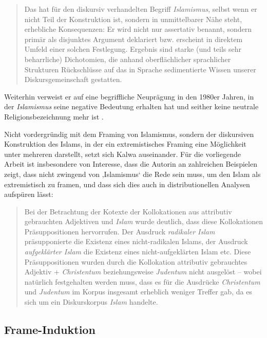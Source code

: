 \begin{quote}
Das hat für den diskursiv verhandelten Begriff \emph{Islamismus}, selbst wenn er nicht Teil der Konstruktion ist, sondern in unmittelbarer Nähe steht, erhebliche Konsequenzen: Er wird nicht nur assertativ benannt, sondern primär als disjunktes Argument deklariert bzw. erscheint in direktem Umfeld einer solchen Festlegung. Ergebnis sind starke (und teils sehr beharrliche) Dichotomien, die anhand oberflächlicher sprachlicher Strukturen Rückschlüsse auf das in Sprache sedimentierte Wissen unserer Diskursgemeinschaft gestatten. \autocite[244]{laschZurVereinbarkeitDiskurslinguistisch2014}
\end{quote}

Weiterhin verweist er auf eine begriffliche Neuprägung in den 1980er Jahren, in der \emph{Islamismus} seine negative Bedeutung erhalten hat und seither keine neutrale Religionsbezeichnung mehr ist \autocite[238-239]{laschZurVereinbarkeitDiskurslinguistisch2014}.

Nicht vordergründig mit dem Framing von Islamismus, sondern der diskursiven Konstruktion des Islams, in der ein extremistisches Framing eine Möglichkeit unter mehreren darstellt, setzt sich Kalwa \autocite*{kalwaKonzeptIslamDiskurslinguistische2013} auseinander. Für die vorliegende Arbeit ist insbesondere von Interesse, dass die Autorin an zahlreichen Beispielen zeigt, dass nicht zwingend von ‚Islamismus` die Rede sein muss, um den Islam als extremistisch zu framen, und dass sich dies auch in distributionellen Analysen aufspüren lässt:

\begin{quote}
Bei der Betrachtung der Kotexte der Kollokationen aus attributiv gebrauchten Adjektiven und \emph{Islam} wurde deutlich, dass diese Kollokationen Präsuppositionen hervorrufen. Der Ausdruck \emph{radikaler Islam} präsupponierte die Existenz eines nicht-radikalen Islams, der Ausdruck \emph{aufgeklärter Islam} die Existenz eines nicht-aufgeklärten Islam etc. Diese Präsuppositionen wurden durch die Kollokation attributiv gebrauchtes Adjektiv + \emph{Christentum} beziehungsweise \emph{Judentum} nicht ausgelöst -- wobei natürlich festgehalten werden muss, dass es für die Ausdrücke \emph{Christentum} und \emph{Judentum} im Korpus insgesamt erheblich weniger Treffer gab, da es sich um ein Diskurskorpus \emph{Islam} handelte. \autocite[333-334]{kalwaKonzeptIslamDiskurslinguistische2013}
\end{quote}

\subsection{Frame-Induktion}\label{frame-induktion}


